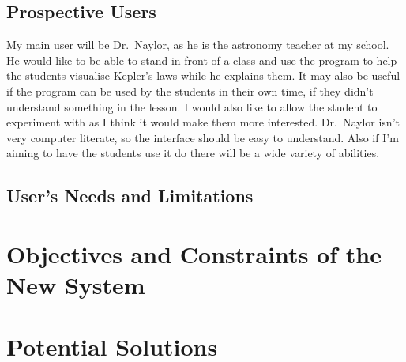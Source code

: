 \subsection{Prospective Users}
My main user will be Dr.~Naylor, as he is the
astronomy teacher at my school. He would like to be able to stand in front of a
class and use the program to help the students visualise Kepler's laws while he
explains them. It may also be useful if the program can be used by the students
in their own time, if they didn't understand something in the lesson. I would
also like to allow the student to experiment with as I think it would make them
more interested. Dr.~Naylor isn't very computer literate, so the interface
should be easy to understand. Also if I'm aiming to have the students use it do
there will be a wide variety of abilities. 


\subsection{User's Needs and Limitations} 


\section{Objectives and Constraints of the New System}
\section{Potential Solutions}
